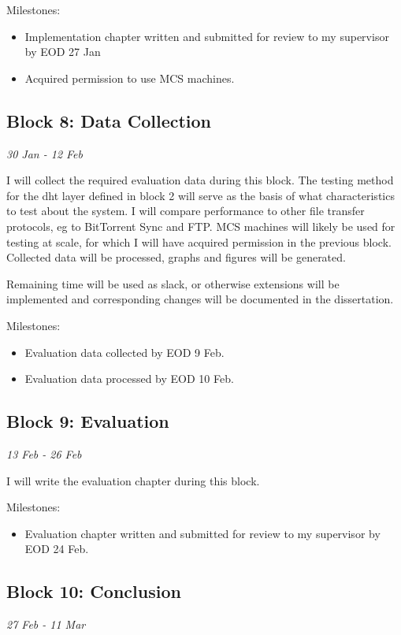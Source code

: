 \documentclass[12pt]{article}
\begin{document}
Milestones:
\begin{itemize}
\item{Implementation chapter written and submitted for review to my supervisor by EOD 27 Jan}
\item{Acquired permission to use MCS machines.}
\end{itemize}


\subsection{Block 8: Data Collection}
\emph{30 Jan - 12 Feb} %

I will collect the required evaluation data during this block. The testing method for the \gls{dht} layer defined in block 2 will serve as the basis of what characteristics to test about the system. I will compare performance to other file transfer protocols, eg to BitTorrent Sync and FTP. MCS machines will likely be used for testing at scale, for which I will have acquired permission in the previous block. Collected data will be processed, graphs and figures will be generated.

Remaining time will be used as slack, or otherwise extensions will be implemented and corresponding changes will be documented in the dissertation.

Milestones:
\begin{itemize}
\item{Evaluation data collected by EOD 9 Feb.}
\item{Evaluation data processed by EOD 10 Feb.}
\end{itemize}

\subsection{Block 9: Evaluation}
\emph{13 Feb - 26 Feb} %

I will write the evaluation chapter during this block.

Milestones:
\begin{itemize}
\item{Evaluation chapter written and submitted for review to my supervisor by EOD 24 Feb.}

\end{itemize}

\subsection{Block 10: Conclusion}
\emph{27 Feb - 11 Mar} %
\end{document}
